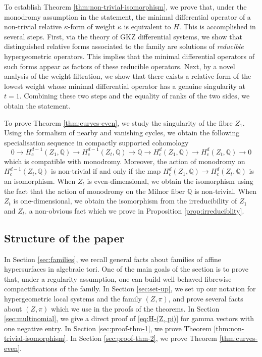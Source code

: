 \documentclass[11pt, reqno]{amsart}
\theoremstyle{plain}
\theoremstyle{definition}
\newcommand{\QQ}{\mathbb{Q}}
\begin{document}
To establish Theorem \ref{thm:non-trivial-isomorphism}, we prove that, under the monodromy assumption in the statement, the minimal differential operator of a non-trivial relative $\kappa$-form of weight $\kappa$ is equivalent to $H$. 
This is accomplished in several steps. First, via the theory of GKZ differential systems, we show that distinguished relative forms associated to the family are solutions of \emph{reducible} hypergeometric operators.
This implies that the minimal differential operators of such forms appear as factors of these reducible operators. Next, by a novel analysis of the weight filtration, we show that there exists a relative form of the lowest weight whose minimal differential operator has a genuine singularity at $t=1$. 
Combining these two steps and the equality of ranks of the two sides, we obtain the statement. 

To prove Theorem \ref{thm:curves-even}, we study the singularity of the fibre \(Z_1\). Using the formalism of nearby and vanishing cycles, we obtain the following specialisation sequence in compactly supported cohomology
\begin{equation*}
0 \to H^{d-1}_c(Z_1, \QQ) \to H^{d-1}_c(Z_t, \QQ) \to \QQ \to H^d_c(Z_1, \QQ) \to H^d_c(Z_t, \QQ) \to 0
\end{equation*}
which is compatible with monodromy. Moreover, the action of monodromy on $H^{d-1}_c(Z_t, \QQ)$ is non-trivial if and only if the map $H^d_c(Z_1, \QQ) \to H^d_c(Z_t, \QQ)$ is an isomorphism. 
When $Z_t$ is even-dimensional, we obtain the isomorphism using the fact that the action of monodromy on the Milnor fiber $\QQ$ is non-trivial.
When $Z_t$ is one-dimensional, we obtain the isomorphism from the irreducibility of $Z_1$ and $Z_t$, a non-obvious fact which we prove in Proposition \ref{prop:irreduciblity}. 



\subsection*{Structure of the paper}
In Section \ref{sec:families}, we recall general facts about families of affine hypersurfaces in algebraic tori. One of the main goals of the section is to prove that, under a regularity assumption, one can build well-behaved fibrewise compactifications of the family. 
In Section \ref{sec:set-up}, we set up our notation for hypergeometric local systems and the family $(Z, \pi)$, and prove several facts about $(Z, \pi)$ which we use in the proofs of the theorems. 
In Section \ref{sec:multinomial}, we give a direct proof of \eqref{eq:H-(Z, pi)} for gamma vectors with one negative entry. 
In Section \ref{sec:proof-thm-1}, we prove Theorem \ref{thm:non-trivial-isomorphism}. 
In Section \ref{sec:proof-thm-2}, we prove Theorem \ref{thm:curves-even}. 
\end{document}
